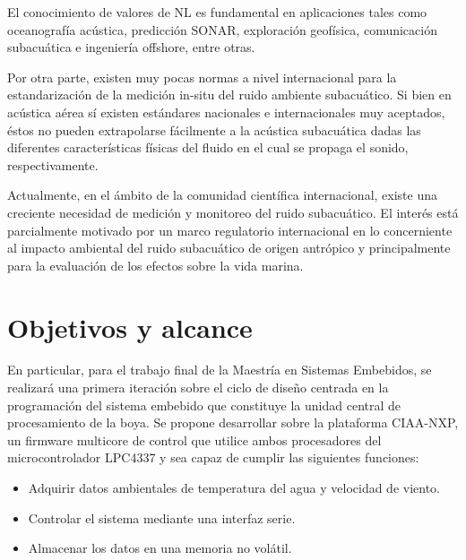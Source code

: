 
El conocimiento de valores de NL es fundamental en aplicaciones tales como oceanografía acústica, predicción SONAR, exploración geofísica, comunicación subacuática e ingeniería offshore, entre otras.

Por otra parte, existen muy pocas normas a nivel internacional para la estandarización de la medición in-situ del ruido ambiente subacuático. Si bien en acústica aérea sí existen estándares nacionales e internacionales muy aceptados, éstos no pueden extrapolarse fácilmente a la acústica subacuática dadas las diferentes características físicas del fluido en el cual se propaga el sonido, respectivamente.

Actualmente, en el ámbito de la comunidad científica internacional, existe una creciente necesidad de medición y monitoreo del ruido subacuático. El interés está parcialmente motivado por un marco regulatorio internacional en lo concerniente al impacto ambiental del ruido subacuático de origen antrópico y principalmente para la evaluación de los efectos sobre la vida marina.



\section{Objetivos y alcance}
\label{sec:objetivosyalcances}


En particular, para el trabajo final de la Maestría en Sistemas Embebidos, se realizará una primera iteración sobre el ciclo de diseño centrada en la programación del sistema embebido que constituye la unidad central de procesamiento de la boya.  Se propone desarrollar sobre la plataforma CIAA-NXP, un firmware multicore de control que utilice ambos procesadores del microcontrolador LPC4337 y sea capaz de cumplir las siguientes funciones:

\begin{itemize}
	\item Adquirir datos ambientales de temperatura del agua y velocidad de viento.
	\item Controlar el sistema mediante una interfaz serie.
	\item Almacenar los datos en una memoria no volátil.
\end{itemize}


